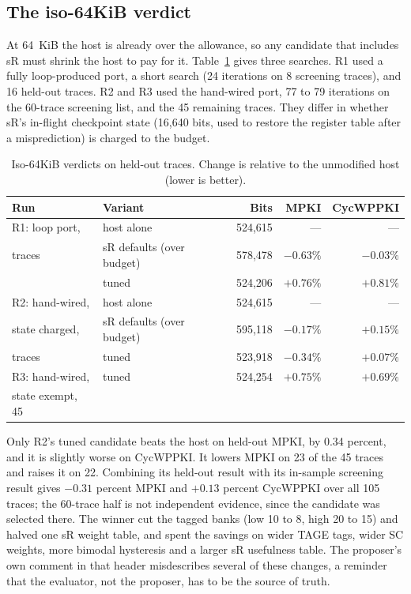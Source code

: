 \documentclass[conference]{IEEEtran}
\begin{document}
\subsection{The iso-64KiB verdict}

At 64~KiB the host is already over the allowance, so any candidate that
includes sR must shrink the host to pay for it. Table~\ref{tab:verdict} gives
three searches. R1 used a fully loop-produced port, a short search (24
iterations on 8 screening traces), and 16 held-out traces. R2 and R3 used the
hand-wired port, 77 to 79 iterations on the 60-trace screening list, and the 45
remaining traces. They differ in whether sR's in-flight checkpoint state
(16,640 bits, used to restore the register table after a misprediction) is
charged to the budget.

\begin{table}[t]
\caption{Iso-64KiB verdicts on held-out traces. Change is relative to the
unmodified host (lower is better).}
\label{tab:verdict}
\centering
\footnotesize
\begin{tabular}{@{}llrrr@{}}
\toprule
Run & Variant & Bits & MPKI & CycWPPKI \\
\midrule
R1: loop port, & host alone & 524,615 & --- & --- \\
\quad 16 traces & sR defaults (over budget) & 578,478 & $-0.63\%$ & $-0.03\%$ \\
 & tuned & 524,206 & $+0.76\%$ & $+0.81\%$ \\
\midrule
R2: hand-wired, & host alone & 524,615 & --- & --- \\
\quad state charged, & sR defaults (over budget) & 595,118 & $-0.17\%$ & $+0.15\%$ \\
\quad 45 traces & tuned & 523,918 & $\mathbf{-0.34\%}$ & $+0.07\%$ \\
\midrule
R3: hand-wired, & tuned & 524,254 & $+0.75\%$ & $+0.69\%$ \\
\quad state exempt, 45 &  &  &  &  \\
\bottomrule
\end{tabular}
\end{table}

Only R2's tuned candidate beats the host on held-out MPKI, by 0.34 percent,
and it is slightly worse on CycWPPKI. It lowers MPKI on 23 of the 45 traces and
raises it on 22. Combining its held-out result with its in-sample screening
result gives $-0.31$ percent MPKI and $+0.13$ percent CycWPPKI over all 105
traces; the 60-trace half is not independent evidence, since the candidate was
selected there. The winner cut the tagged banks (low 10 to 8, high 20 to 15)
and halved one sR weight table, and spent the savings on wider TAGE tags, wider
SC weights, more bimodal hysteresis and a larger sR usefulness table. The
proposer's own comment in that header misdescribes several of these changes, a
reminder that the evaluator, not the proposer, has to be the source of truth.
\end{document}
